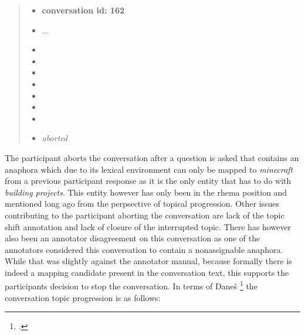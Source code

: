     \begin{quote}
    \begin{itemize}[label={}, leftmargin=0pt, itemsep=0.5em]
    \item \textbf{conversation id: 162}
    \item ...
    \item {}
    \item {}
    \item {}
    \item {}
    \item {}
    \item {}
    \item {}
    \item \textit{aborted}
    \end{itemize}
    \end{quote}

    The participant aborts the conversation after a question is asked that contains an anaphora
    which due to its lexical environment can only be mapped to \textit{minecraft} from a previous participant response
    as it is the only entity that has to do with \textit{building projects}.
    This entity however has only been in the rhema position and mentioned long ago from the perpsective of topical progression.
    Other issues contributing to the participant aborting the conversation are lack of the topic shift annotation
    and lack of closure of the interrupted topic.
    There has however also been an annotator disagreement on this conversation
    as one of the annotators considered this conversation to contain a nonassignable anaphora.
    While that was slightly against the annotator manual,
    because formally there is indeed a mapping candidate present in the conversation text,
    this supports the participants decision to stop the conversation.
    In terms of Daneš \footcite{danevs1989functional} the conversation topic progression is as follows:

